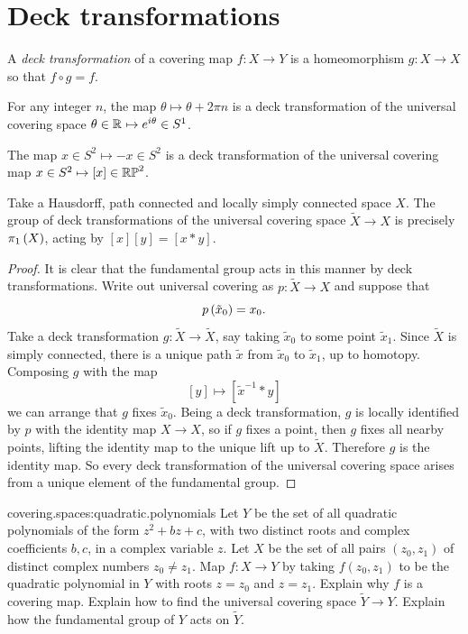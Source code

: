 \section{Deck transformations}
A \emph{deck transformation}%
of a covering map \(f \colon X \to Y\) is a homeomorphism \(g \colon X \to X\) so that \(f \circ g = f\).
\begin{example}
For any integer \(n\), the map \(\theta \mapsto \theta+2 \pi n\) is a deck transformation of the universal covering space \(\theta \in \mathbb{R}^{} \mapsto e^{i \theta} \in S^1\).
\end{example}
\begin{example}
The map \(x \in S^2 \mapsto -x \in S^2\) is a deck transformation of the universal covering map \(x \in S^2 \mapsto [x] \in \mathbb{RP}^{2}\).
\end{example} 
\begin{lemma}
Take a Hausdorff, path connected and locally simply connected space \(X\).
The group of deck transformations of the universal covering space \(\tilde{X} \to X\) is precisely \(\pi_{1}\left(X\right)\), acting by \([x][y]=[x*y]\).
\end{lemma}
\begin{proof}
It is clear that the fundamental group acts in this manner by deck transformations.
Write out universal covering as \(p \colon \tilde{X} \to X\) and suppose that 
\[
p\left(\tilde{x}_0\right)=x_0.
\]
Take a deck transformation \(g \colon \tilde{X} \to \tilde{X}\), say taking \(\tilde{x}_0\) to some point \(\tilde{x}_1\).
Since \(\tilde{X}\) is simply connected, there is a unique path \(\tilde{x}\) from \(\tilde{x}_0\) to \(\tilde{x}_1\), up to homotopy.
Composing \(g\) with the map 
\[
[y] \mapsto \left[\tilde{x}^{-1}*y\right]
\]
we can arrange that \(g\) fixes \(\tilde{x}_0\).
Being a deck transformation, \(g\) is locally identified by \(p\) with the identity map \(X \to X\), so if \(g\) fixes a point, then \(g\) fixes all nearby points, lifting the identity map to the unique lift up to \(\tilde{X}\).
Therefore \(g\) is the identity map. 
So every deck transformation of the universal covering space arises from a unique element of the fundamental group.
\end{proof}
\begin{problem}{covering.spaces:quadratic.polynomials}
Let \(Y\) be the set of all quadratic polynomials of the form \(z^2+bz+c\), with two distinct roots and complex coefficients \(b,c\), in a complex variable \(z\).
Let \(X\) be the set of all pairs \((z_0,z_1)\) of distinct complex numbers \(z_0 \ne z_1\).
Map \(f \colon X \to Y\) by taking \(f(z_0,z_1)\) to be the quadratic polynomial in \(Y\) with roots \(z=z_0\) and \(z=z_1\).
Explain why \(f\) is a covering map. 
Explain how to find the universal covering space \(\tilde{Y} \to Y\).
Explain how the fundamental group of \(Y\) acts on \(\tilde{Y}\).
\end{problem}

